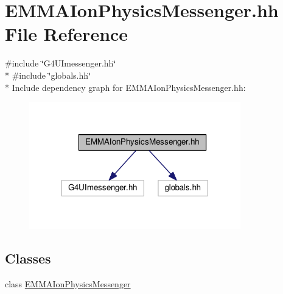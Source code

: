 \hypertarget{EMMAIonPhysicsMessenger_8hh}{}\section{E\+M\+M\+A\+Ion\+Physics\+Messenger.\+hh File Reference}
\label{EMMAIonPhysicsMessenger_8hh}
{\ttfamily \#include \char`\"{}G4\+U\+Imessenger.\+hh\char`\"{}}\\*
{\ttfamily \#include \char`\"{}globals.\+hh\char`\"{}}\\*
Include dependency graph for E\+M\+M\+A\+Ion\+Physics\+Messenger.\+hh\+:
\nopagebreak
\begin{figure}[H]
\begin{center}
\leavevmode
\includegraphics[width=260pt]{EMMAIonPhysicsMessenger_8hh__incl}
\end{center}
\end{figure}
\subsection*{Classes}
\begin{DoxyCompactItemize}
\item 
class \hyperlink{classEMMAIonPhysicsMessenger}{E\+M\+M\+A\+Ion\+Physics\+Messenger}
\end{DoxyCompactItemize}
